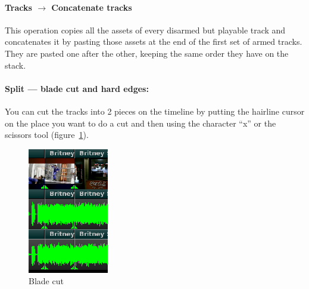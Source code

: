 \paragraph{Tracks $\rightarrow$ Concatenate tracks} This operation copies all the assets of every disarmed but playable
track and concatenates it by pasting those assets at the end of the first set of armed tracks. They are
pasted one after the other, keeping the same order they have on the stack.

\paragraph{Split --- blade cut and hard edges:} You can cut the tracks into 2 pieces on the timeline by putting the hairline cursor on the place you want to do a cut and then using the character “x” or the scissors tool (figure~\ref{fig:cut}). 

\begin{figure}
    \vspace{-1ex}
    \centering
    \includegraphics[width=0.9\linewidth]{images/cut.png}
    \caption{Blade cut}
    \label{fig:cut}
\end{figure}

